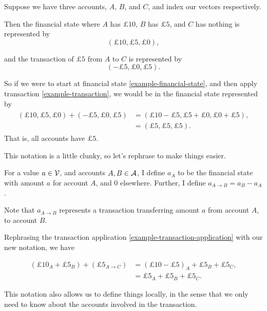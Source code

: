 \begin{example}
    Suppose we have three accounts, $A$, $B$, and $C$, and index our vectors respectively.

    Then the financial state where $A$ has $\pounds 10$, $B$ has $\pounds 5$, and $C$ has nothing is represented by
    \begin{equation}
        \label{example-financial-state}
        (\pounds 10, \pounds 5, \pounds 0),
    \end{equation}

    and the transaction of $\pounds 5$ from $A$ to $C$ is represented by
    \begin{equation}
        \label{example-transaction}
        (-\pounds 5, \pounds 0, \pounds 5).
    \end{equation}

    So if we were to start at financial state \eqref{example-financial-state}, and then apply transaction \eqref{example-transaction},
    we would be in the financial state represented by
    \begin{align}
        \begin{split}
            \label{example-transaction-application}
            (\pounds 10, \pounds 5, \pounds 0) + (-\pounds 5, \pounds 0, \pounds 5) &= (\pounds 10 - \pounds 5, \pounds 5 + \pounds 0, \pounds 0 + \pounds 5), \\
            &= (\pounds 5, \pounds 5, \pounds 5).
        \end{split}
    \end{align}
    That is, all accounts have $\pounds 5$.
\end{example}

This notation is a little clunky, so let's rephrase to make things easier.

\begin{notation}
    For a value $a \in \mathcal{V}$, and accounts $A, B \in \mathcal{A}$,
    I define $a_A$ to be the financial state with amount $a$ for account $A$, and $0$ elsewhere.
    Further, I define $a_{A \to B} = a_B - a_A$.
\end{notation}

Note that $a_{A \to B}$ represents a transaction transferring amount $a$ from account $A$, to account $B$.

\begin{example}
    Rephrasing the transaction application \eqref{example-transaction-application} with our new notation, we have

    \begin{align*}
        (\pounds 10_A + \pounds 5_B) + (\pounds 5_{A \to C}) &= (\pounds 10 - \pounds 5)_A + \pounds 5_B + \pounds 5_C, \\
        &= \pounds 5_A + \pounds 5_B + \pounds 5_C.
    \end{align*}
\end{example}

This notation also allows us to define things locally,
in the sense that we only need to know about the accounts involved in the transaction.
